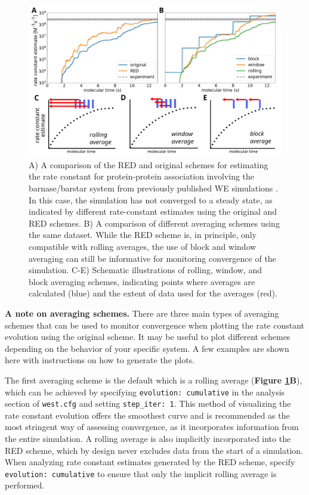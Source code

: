 \begin{figure}[t]
\centering
\vspace{-0.25cm}
\includegraphics[width=\columnwidth]{figures/Figure8_analysis.pdf}
\vspace{-0.5cm}
\caption{A) A comparison of the RED and original schemes for estimating the rate constant for protein-protein association involving the barnase/barstar system from previously published WE simulations \citep{saglam_proteinprotein_2019}.
In this case, the simulation has not converged to a steady state, as indicated by different rate-constant estimates using the original and RED schemes.
B) A comparison of different averaging schemes using the same dataset.
While the RED scheme is, in principle, only compatible with rolling averages, the use of block and window averaging can still be informative for monitoring convergence of the simulation.
C-E) Schematic illustrations of rolling, window, and block averaging schemes, indicating points where averages are calculated (blue) and the extent of data used for the averages (red).}
\label{fig:red-flux}
\vspace{-0.25cm}
\end{figure}

\pagebreak

\textbf{A note on averaging schemes.} 
There are three main types of averaging schemes that can be used to monitor convergence when plotting the rate constant evolution using the original scheme.
It may be useful to plot different schemes depending on the behavior of your specific system.
A few examples are shown here with instructions on how to generate the plots.

The first averaging scheme is the default which is a rolling average (\textbf{Figure \ref{fig:red-flux}B}), which can be achieved by specifying \verb|evolution: cumulative| in the analysis section of \verb|west.cfg| and setting \verb|step_iter: 1|.
This method of visualizing the rate constant evolution offers the smoothest curve and is recommended as the most stringent way of assessing convergence, as it incorporates information from the entire simulation.
A rolling average is also implicitly incorporated into the RED scheme, which by design never excludes data from the start of a simulation.
When analyzing rate constant estimates generated by the RED scheme, specify \verb|evolution: cumulative| to ensure that only the implicit rolling average is performed.


